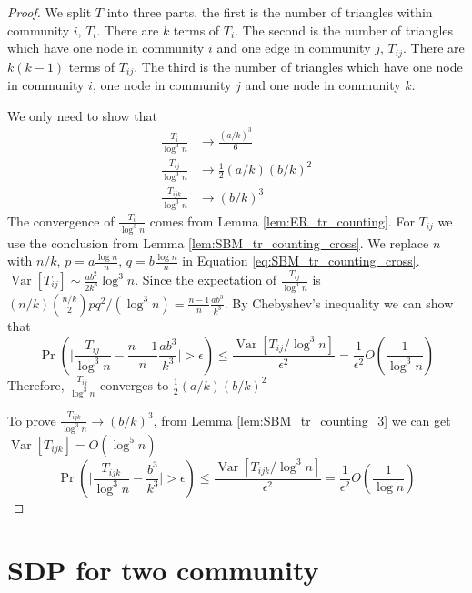 \documentclass{ctexart}
\DeclareMathOperator{\Var}{Var}
\begin{document}
\begin{proof}
	We split $T$ into three parts, the first is the number of triangles within community $i$, $T_i$. There are $k$ terms of $T_i$.
	The second is the number of triangles which have one node in community $i$ and one edge in community $j$, $T_{ij}$. There are $k(k-1)$ terms of $T_{ij}$. The third is the number of triangles which have one node in community $i$, one node in community $j$ and one node in community $k$.
	
	We only need to show that
	\begin{align}
	\frac{T_i}{\log ^3 n} &\to \frac{(a/k)^3}{6} \\
	\frac{T_{ij}}{\log^3 n}& \to \frac{1}{2}(a/k)(b/k)^2\\
	\frac{T_{ijk}}{\log^3 n} & \to (b/k)^3
	\end{align}
	The convergence of $\frac{T_i}{\log ^3 n}$ comes from Lemma \ref{lem:ER_tr_counting}.
	For $T_{ij}$ we use the conclusion from Lemma \ref{lem:SBM_tr_counting_cross}.
	We replace $n$ with $n/k$, $p=a\frac{\log n}{n}$, $q=b\frac{\log n}{n}$ in Equation \eqref{eq:SBM_tr_counting_cross}.
	$\Var[T_{ij}] \sim \frac{ab^2}{2k^3} \log^3 n$. Since the expectation of $\frac{T_{ij}}{\log^3 n}$ is $(n/k)\binom{n/k}{2}pq^2/(\log^3 n)
	=\frac{n-1}{n}\frac{ab^3}{k^3}$. By Chebyshev's inequality we can show that 
	$$
	\Pr( \Big|\frac{T_{ij}}{\log^3 n} - \frac{n-1}{n}\frac{ab^3}{k^3} \Big| > \epsilon) \leq \frac{\Var[T_{ij} / \log^3 n]}{\epsilon^2} = \frac{1}{\epsilon^2}
	O(\frac{1}{\log^3 n})
	$$
	Therefore, $\frac{T_{ij}}{\log^3 n} $ converges to $\frac{1}{2}(a/k)(b/k)^2$
	
	To prove $\frac{T_{ijk}}{\log^3 n}\to (b/k)^3$, from Lemma \ref{lem:SBM_tr_counting_3} we can get $\Var[T_{ijk}] = O(\log^5 n)$
$$
\Pr( \Big|\frac{T_{ijk}}{\log^3 n} -\frac{b^3}{k^3} \Big| > \epsilon) \leq \frac{\Var[T_{ijk} / \log^3 n]}{\epsilon^2} = \frac{1}{\epsilon^2}
O(\frac{1}{\log n})
$$
\end{proof}
\section{SDP for two community}
\end{document}
